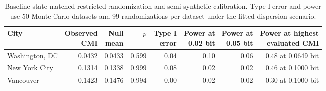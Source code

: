 \begin{table}[!htbp]
\caption{Baseline-state-matched restricted randomization and semi-synthetic
calibration. Type I error and power use 50 Monte Carlo datasets and 99
randomizations per dataset under the fitted-dispersion scenario.}
\label{tab:e18_restricted_calibration}
\centering
\setlength{\tabcolsep}{2.5pt}
\begin{tabular*}{\textwidth}{@{\extracolsep{\fill}}lrrrrrrr@{}}
\toprule
\textbf{City} & \shortstack{\textbf{Observed}\\\textbf{CMI}} &
\shortstack{\textbf{Null}\\\textbf{mean}} &
\textbf{\(p\)} & \shortstack{\textbf{Type I}\\\textbf{error}} &
\shortstack{\textbf{Power at}\\\textbf{0.02 bit}} &
\shortstack{\textbf{Power at}\\\textbf{0.05 bit}} &
\shortstack{\textbf{Power at highest}\\\textbf{evaluated CMI}}\\
\midrule
Washington, DC & 0.0432 & 0.0433 & 0.599 & 0.04 & 0.10 & 0.06 &
0.48 at 0.0649 bit\\
New York City & 0.1314 & 0.1338 & 0.999 & 0.08 & 0.02 & 0.02 &
0.46 at 0.1000 bit\\
Vancouver & 0.1423 & 0.1476 & 0.994 & 0.00 & 0.02 & 0.02 &
0.30 at 0.1000 bit\\
\bottomrule
\end{tabular*}
\end{table}
